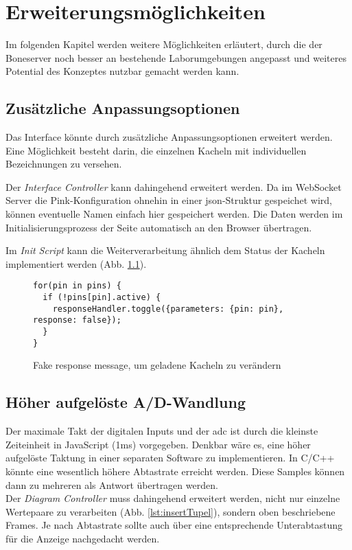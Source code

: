 \chapter{Erweiterungsmöglichkeiten}
Im folgenden Kapitel werden weitere Möglichkeiten erläutert, durch die der Boneserver noch besser an bestehende Laborumgebungen angepasst und weiteres Potential des Konzeptes nutzbar gemacht werden kann.

\section{Zusätzliche Anpassungsoptionen}
Das Interface könnte durch zusätzliche Anpassungsoptionen erweitert werden. Eine Mög\-lich\-keit besteht darin, die einzelnen Kacheln mit individuellen Bezeichnungen zu versehen.

Der \textit{Interface Controller} kann dahingehend erweitert werden. Da im WebSocket Server die Pink-Konfiguration ohnehin in einer \gls{json}-Struktur gespeichet wird, können eventuelle Namen einfach hier gespeichert werden. Die Daten werden im Initialisierungsprozess der Seite automatisch an den Browser übertragen.

Im \textit{Init Script} kann die Weiterverarbeitung ähnlich dem Status der Kacheln implementiert werden (Abb. \ref{lst:fakeResponseMessage}).

\begin{figure}[H]
\begin{lstlisting}
for(pin in pins) {
  if (!pins[pin].active) {
    responseHandler.toggle({parameters: {pin: pin}, response: false});
  }
}
\end{lstlisting}
\caption{Fake response message, um geladene Kacheln zu verändern}
\label{lst:fakeResponseMessage}
\end{figure}


\section{Höher aufgelöste A/D-Wandlung}
Der maximale Takt der digitalen Inputs und der \gls{adc} ist durch die kleinste Zeiteinheit in JavaScript (1ms) vorgegeben. Denkbar wäre es, eine höher aufgelöste Taktung in einer separaten Software zu implementieren. In C/C++ könnte eine wesentlich höhere Ab\-tast\-rate erreicht werden. Diese Samples können dann zu mehreren als Antwort übertragen werden.\\

Der \textit{Diagram Controller} muss dahingehend erweitert werden, nicht nur einzelne Wertepaare zu verarbeiten (Abb. \ref{lst:insertTupel}), sondern oben beschriebene Frames. Je nach Abtastrate sollte auch über eine entsprechende Unterabtastung für die Anzeige nachgedacht werden.

